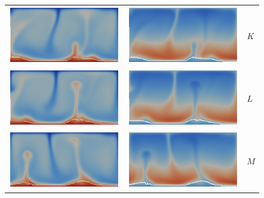 \begin{figure}[htbp]
\begin{center}
\begin{tabular}{c c l}
\includegraphics[width=0.45\columnwidth]{chapters/vynnytska/figures/tmK.png} &
\includegraphics[width=0.45\columnwidth]{chapters/vynnytska/figures/visK.png} & $K$ \\
\includegraphics[width=0.45\columnwidth]{chapters/vynnytska/figures/tmL.png} &
\includegraphics[width=0.45\columnwidth]{chapters/vynnytska/figures/visL.png} & $L$ \\
\includegraphics[width=0.45\columnwidth]{chapters/vynnytska/figures/tmM.png} &
\includegraphics[width=0.45\columnwidth]{chapters/vynnytska/figures/visM.png} & $M$ \\

\end{tabular}
\end{center}
\end{figure}
